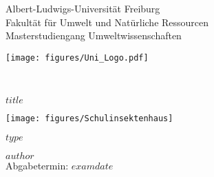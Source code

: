 \documentclass[a4paper,11pt]{article}
\newcommand{\thesistype}{$type$}
\begin{document}
\thispagestyle{empty}

\raggedright

\begin{center}

\begin{minipage}{0.8\textwidth}%
		{\large{ \begin{flushleft}Albert-Ludwigs-Universität Freiburg \\
				Fakultät für Umwelt und Natürliche Ressourcen \\
				Masterstudiengang Umweltwissenschaften \\%
			\end{flushleft}
			}
	}
\end{minipage}%
\hspace{0.5cm}
\begin{minipage}{0.15\textwidth}%
	\texttt{[image: figures/Uni\_Logo.pdf]}
\end{minipage} \\ \vspace*{\fill}


 
  \Large{$title$} \\ \vspace*{\fill}
  
  \texttt{[image: figures/Schulinsektenhaus]}
  

  \large{\thesistype{}} \\ \vspace*{\fill}
  
  
  \large{$author$} \\
  \large{Abgabetermin: $examdate$}

\end{center}
\newpage\null\thispagestyle{empty}\newpage


\newpage
\thispagestyle{empty}
\end{document}
